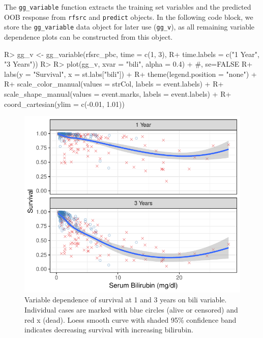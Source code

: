 \documentclass[article]{jss}
\begin{document}
The \texttt{gg\_variable} function extracts the training set variables
and the predicted OOB response from \texttt{rfsrc} and \texttt{predict}
objects. In the following code block, we store the \texttt{gg\_variable}
data object for later use (\texttt{gg\_v}), as all remaining variable
dependence plots can be constructed from this object.

\begin{Schunk}
\begin{Sinput}
R> gg_v <- gg_variable(rfsrc_pbc, time = c(1, 3),
R+                     time.labels = c("1 Year", "3 Years"))
R> 
R> plot(gg_v, xvar = "bili", alpha = 0.4) + #, se=FALSE
R+   labs(y = "Survival", x = st.labs["bili"]) +
R+   theme(legend.position = "none") +
R+   scale_color_manual(values = strCol, labels = event.labels) +
R+   scale_shape_manual(values = event.marks, labels = event.labels) +
R+   coord_cartesian(ylim = c(-0.01, 1.01))
\end{Sinput}
\begin{figure}[!htb]

{\centering \includegraphics{rfs-variable-plotbili-1} 

}

\caption[Variable dependence of survival at 1 and 3 years on bili variable]{Variable dependence of survival at 1 and 3 years on bili variable. Individual cases are marked with blue circles (alive or censored) and red x (dead). Loess smooth curve with shaded 95\% confidence band indicates decreasing survival with increasing bilirubin.}\label{fig:variable-plotbili}
\end{figure}
\end{Schunk}
\end{document}
